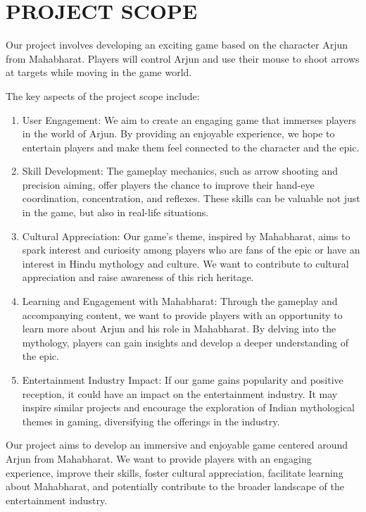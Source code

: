 	\newpage
\section{PROJECT SCOPE}
Our project involves developing an exciting game based on the character Arjun from Mahabharat. Players will control Arjun and use their mouse to shoot arrows at targets while moving in the game world.

The key aspects of the project scope include:

\begin{enumerate}
	\item User Engagement:
		We aim to create an engaging game that immerses players in the world of Arjun. By providing an enjoyable experience, we hope to entertain players and make them feel connected to the character and the epic.
	
	\item Skill Development:
	The gameplay mechanics, such as arrow shooting and precision aiming, offer players the chance to improve their hand-eye coordination, concentration, and reflexes. These skills can be valuable not just in the game, but also in real-life situations.
	
	\item Cultural Appreciation:
		Our game's theme, inspired by Mahabharat, aims to spark interest and curiosity among players who are fans of the epic or have an interest in Hindu mythology and culture. We want to contribute to cultural appreciation and raise awareness of this rich heritage.
	
	\item Learning and Engagement with Mahabharat:
	 Through the gameplay and accompanying content, we want to provide players with an opportunity to learn more about Arjun and his role in Mahabharat. By delving into the mythology, players can gain insights and develop a deeper understanding of the epic.
	 
	 \item Entertainment Industry Impact: 
	 If our game gains popularity and positive reception, it could have an impact on the entertainment industry. It may inspire similar projects and encourage the exploration of Indian mythological themes in gaming, diversifying the offerings in the industry.
\end{enumerate}


Our project aims to develop an immersive and enjoyable game centered around Arjun from Mahabharat. We want to provide players with an engaging experience, improve their skills, foster cultural appreciation, facilitate learning about Mahabharat, and potentially contribute to the broader landscape of the entertainment industry.

\pagebreak

